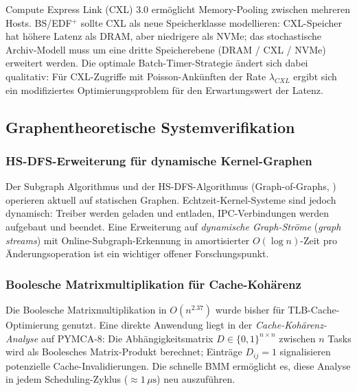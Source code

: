 ﻿\documentclass[a4paper,12pt]{scrreprt}
\theoremstyle{definition}
\begin{document}
	Compute Express Link (CXL) 3.0 ermöglicht Memory-Pooling zwischen
	mehreren Hosts. BS/EDF$^+$ sollte CXL als neue Speicherklasse
	modellieren: CXL-Speicher hat höhere Latenz als DRAM, aber niedrigere
	als NVMe; das stochastische Archiv-Modell \cite{Epp2026archv} muss
	um eine dritte Speicherebene (DRAM / CXL / NVMe) erweitert werden.
	Die optimale Batch-Timer-Strategie ändert sich dabei qualitativ:
	Für CXL-Zugriffe mit Poisson-Ankünften der Rate $\lambda_{CXL}$
	ergibt sich ein modifiziertes Optimierungsproblem für den
	Erwartungswert der Latenz.
	
	\subsection{Graphentheoretische Systemverifikation}
	
	\subsubsection{HS-DFS-Erweiterung für dynamische Kernel-Graphen}
	
	Der Subgraph Algorithmus \cite{Epp2026subgraph} und der
	HS-DFS-Algorithmus (Graph-of-Graphs, \cite{Epp2026msubgraph}) operieren
	aktuell auf statischen Graphen. Echtzeit-Kernel-Systeme sind jedoch
	dynamisch: Treiber werden geladen und entladen, IPC-Verbindungen
	werden aufgebaut und beendet. Eine Erweiterung auf \emph{dynamische
		Graph-Ströme} (\emph{graph streams}) mit Online-Subgraph-Erkennung
	in amortisierter $O(\log n)$-Zeit pro Änderungsoperation ist ein
	wichtiger offener Forschungspunkt.
	
	\subsubsection{Boolesche Matrixmultiplikation für Cache-Kohärenz}
	
	Die Boolesche Matrixmultiplikation in $O(n^{2.37})$
	\cite{Epp2026boolmm} wurde bisher für TLB-Cache-Opti\-mierung
	genutzt. Eine direkte Anwendung liegt in der \emph{Cache-Kohärenz-Analyse}
	auf PYMCA-8: Die Abhängigkeitsmatrix $D \in \{0,1\}^{n \times n}$
	zwischen $n$ Tasks wird als Boolesches Matrix-Produkt berechnet;
	Einträge $D_{ij} = 1$ signalisieren potenzielle Cache-Invalidierungen.
	Die schnelle BMM ermöglicht es, diese Analyse in jedem
	Scheduling-Zyklus ($\approx 1\,\mu\text{s}$) neu auszuführen.
	
\end{document}
